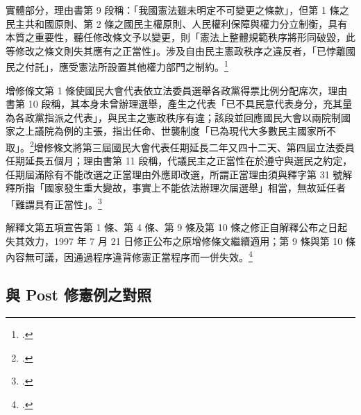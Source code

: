 實體部分，理由書第 9 段稱：「我國憲法雖未明定不可變更之條款」，但第 1 條之民主共和國原則、第 2 條之國民主權原則、人民權利保障與權力分立制衡，具有本質之重要性，聽任修改條文予以變更，則「憲法上整體規範秩序將形同破毀，此等修改之條文則失其應有之正當性」。涉及自由民主憲政秩序之違反者，「已悖離國民之付託」，應受憲法所設置其他權力部門之制約。\footcite[解釋文第二項；理由書第 9 段]{jy499}

增修條文第 1 條使國民大會代表依立法委員選舉各政黨得票比例分配席次，理由書第 10 段稱，其本身未曾辦理選舉，產生之代表「已不具民意代表身分，充其量為各政黨指派之代表」，與民主之憲政秩序有違；該段並回應國民大會以兩院制國家之上議院為例的主張，指出任命、世襲制度「已為現代大多數民主國家所不取」。\footcite[理由書第 10 段]{jy499}增修條文將第三屆國民大會代表任期延長二年又四十二天、第四屆立法委員任期延長五個月；理由書第 11 段稱，代議民主之正當性在於遵守與選民之約定，任期屆滿除有不能改選之正當理由外應即改選，所謂正當理由須與釋字第 31 號解釋所指「國家發生重大變故，事實上不能依法辦理次屆選舉」相當，無故延任者「難謂具有正當性」。\footcite[理由書第 11 段]{jy499}

解釋文第五項宣告第 1 條、第 4 條、第 9 條及第 10 條之修正自解釋公布之日起失其效力，1997 年 7 月 21 日修正公布之原增修條文繼續適用；第 9 條與第 10 條內容無可議，因通過程序違背修憲正當程序而一併失效。\footcite[解釋文第五項；理由書第 12 段]{jy499}

\subsection{與 Post 修憲例之對照}

